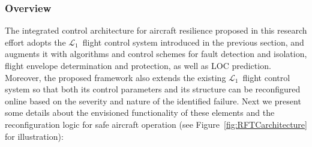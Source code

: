 \documentclass[letter,onecolumn,12pt]{aiaa-tc}
\newcommand{\Lone}{\mathcal{L}_1}
\begin{document}
\subsubsection{Overview}

The integrated control architecture for aircraft resilience proposed in this research effort adopts the $\Lone$~flight control system introduced in the previous section, and augments it with algorithms and control schemes for fault detection and isolation, flight envelope determination and protection, as well as LOC prediction. Moreover, the proposed framework also extends the existing $\Lone$~flight control system so that both its control parameters and its structure can be reconfigured online based on the severity and nature of the identified failure. Next we present some details about the envisioned functionality of these elements and the reconfiguration logic for safe aircraft operation (see Figure~\ref{fig:RFTCarchitecture} for illustration):
\end{document}

